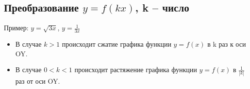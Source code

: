 \subsection{Преобразование $y = f (kx)$, k   – число}

Пример: $y=\sqrt{3x}$, $y=\frac{1}{3x}$

\begin{itemize}
    \item В случае $k > 1$ происходит сжатие графика функции $ y = f (x)$ в k раз к оси OY.
    \item В случае   $0 < k < 1$   происходит растяжение графика функции $y = f (x)  $ в  $\frac{1}{|k|}$ раз от оси OY.
\end{itemize}

\begin{figure}[h!]
	\begin{minipage}[h]{0.49\linewidth}
	\end{minipage}
	\hfill
	\begin{minipage}[h]{0.49\linewidth}
	\end{minipage}
	\label{ris:image1}
\end{figure}

